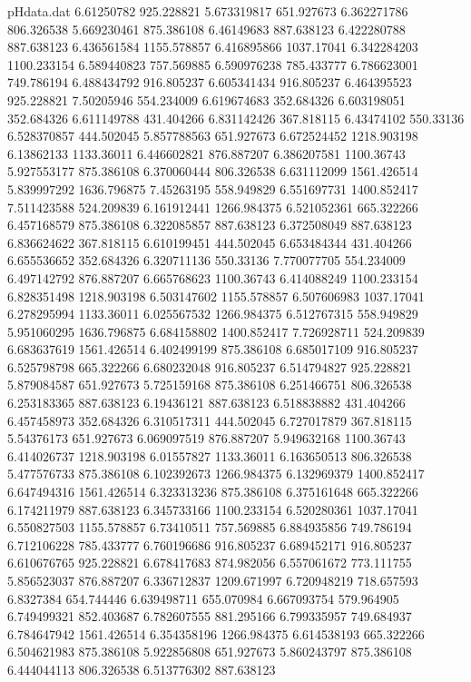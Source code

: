 \begin{filecontents}{pHdata.dat}
6.61250782	925.228821
5.673319817	651.927673
6.362271786	806.326538
5.669230461	875.386108
6.46149683	887.638123
6.422280788	887.638123
6.436561584	1155.578857
6.416895866	1037.17041
6.342284203	1100.233154
6.589440823	757.569885
6.590976238	785.433777
6.786623001	749.786194
6.488434792	916.805237
6.605341434	916.805237
6.464395523	925.228821
7.50205946	554.234009
6.619674683	352.684326
6.603198051	352.684326
6.611149788	431.404266
6.831142426	367.818115
6.43474102	550.33136
6.528370857	444.502045
5.857788563	651.927673
6.672524452	1218.903198
6.13862133	1133.36011
6.446602821	876.887207
6.386207581	1100.36743
5.927553177	875.386108
6.370060444	806.326538
6.631112099	1561.426514
5.839997292	1636.796875
7.45263195	558.949829
6.551697731	1400.852417
7.511423588	524.209839
6.161912441	1266.984375
6.521052361	665.322266
6.457168579	875.386108
6.322085857	887.638123
6.372508049	887.638123
6.836624622	367.818115
6.610199451	444.502045
6.653484344	431.404266
6.655536652	352.684326
6.320711136	550.33136
7.770077705	554.234009
6.497142792	876.887207
6.665768623	1100.36743
6.414088249	1100.233154
6.828351498	1218.903198
6.503147602	1155.578857
6.507606983	1037.17041
6.278295994	1133.36011
6.025567532	1266.984375
6.512767315	558.949829
5.951060295	1636.796875
6.684158802	1400.852417
7.726928711	524.209839
6.683637619	1561.426514
6.402499199	875.386108
6.685017109	916.805237
6.525798798	665.322266
6.680232048	916.805237
6.514794827	925.228821
5.879084587	651.927673
5.725159168	875.386108
6.251466751	806.326538
6.253183365	887.638123
6.19436121	887.638123
6.518838882	431.404266
6.457458973	352.684326
6.310517311	444.502045
6.727017879	367.818115
5.54376173	651.927673
6.069097519	876.887207
5.949632168	1100.36743
6.414026737	1218.903198
6.01557827	1133.36011
6.163650513	806.326538
5.477576733	875.386108
6.102392673	1266.984375
6.132969379	1400.852417
6.647494316	1561.426514
6.323313236	875.386108
6.375161648	665.322266
6.174211979	887.638123
6.345733166	1100.233154
6.520280361	1037.17041
6.550827503	1155.578857
6.73410511	757.569885
6.884935856	749.786194
6.712106228	785.433777
6.760196686	916.805237
6.689452171	916.805237
6.610676765	925.228821
6.678417683	874.982056
6.557061672	773.111755
5.856523037	876.887207
6.336712837	1209.671997
6.720948219	718.657593
6.8327384	654.744446
6.639498711	655.070984
6.667093754	579.964905
6.749499321	852.403687
6.782607555	881.295166
6.799335957	749.684937
6.784647942	1561.426514
6.354358196	1266.984375
6.614538193	665.322266
6.504621983	875.386108
5.922856808	651.927673
5.860243797	875.386108
6.444044113	806.326538
6.513776302	887.638123

\end{filecontents}
